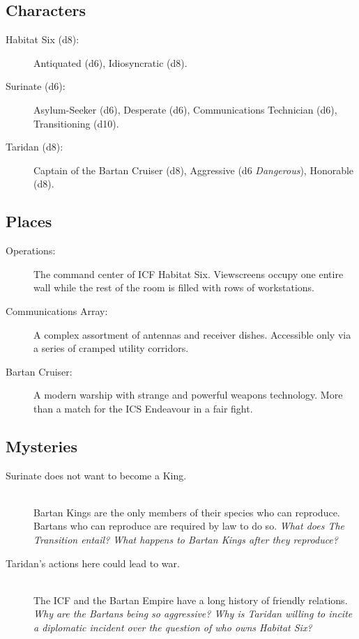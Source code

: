 \documentclass[11pt, a5paper, parskip=half-, DIV=12]{scrartcl}
\begin{document}
\newpage

\subsection*{Characters}
\begin{description}
	\item[Habitat Six (d8):] Antiquated (d6), Idiosyncratic (d8). 
	\item[Surinate (d6):] Asylum-Seeker (d6), Desperate (d6), Communications Technician (d6), Transitioning (d10).
	\item[Taridan (d8):] Captain of the Bartan Cruiser (d8), Aggressive (d6 \textit{Dangerous}), Honorable (d8).
\end{description}

\subsection*{Places}
\begin{description}
	\item[Operations:] The command center of ICF Habitat Six. Viewscreens occupy one entire wall while the rest of the room is filled with rows of workstations.
	\item[Communications Array:] A complex assortment of antennas and receiver dishes. Accessible only via a series of cramped utility corridors.
	\item[Bartan Cruiser:] A modern warship with strange and powerful weapons technology. More than a match for the ICS Endeavour in a fair fight.
\end{description}

\subsection*{Mysteries}
\begin{description}
	\item[Surinate does not want to become a King.]\phantom{a}\\ Bartan Kings are the only members of their species who can reproduce. Bartans who can reproduce are required by law to do so. \textit{ What does The Transition entail? What happens to Bartan Kings after they reproduce?}

	\item[Taridan's actions here could lead to war.]\phantom{a}\\
	The ICF and the Bartan Empire have a long history of friendly relations. \textit{Why are the Bartans being so aggressive? Why is Taridan willing to incite a diplomatic incident over the question of who owns Habitat Six?}
\end{description}
\end{document}
